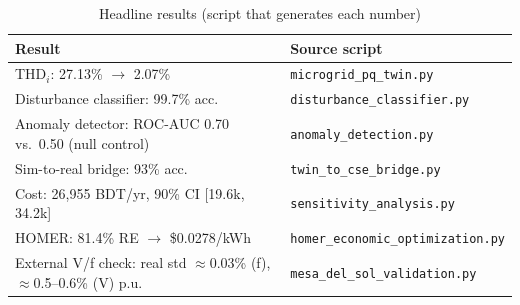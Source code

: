 \documentclass[conference]{IEEEtran}
\begin{document}
\begin{table}[t]
\centering
\caption{Headline results (script that generates each number)}
\label{tab:summary}
\begin{tabular}{p{4.6cm}p{3cm}}
\toprule
Result & Source script \\
\midrule
THD$_i$: 27.13\% $\to$ 2.07\% & \texttt{microgrid\_pq\_twin.py} \\
Disturbance classifier: 99.7\% acc. & \texttt{disturbance\_classifier.py} \\
Anomaly detector: ROC-AUC 0.70 vs.\ 0.50 (null control) & \texttt{anomaly\_detection.py} \\
Sim-to-real bridge: 93\% acc. & \texttt{twin\_to\_cse\_bridge.py} \\
Cost: 26,955 BDT/yr, 90\% CI [19.6k, 34.2k] & \texttt{sensitivity\_analysis.py} \\
HOMER: 81.4\% RE $\to$ \$0.0278/kWh & \texttt{homer\_economic\_optimization.py} \\
External V/f check: real std $\approx$0.03\% (f), $\approx$0.5--0.6\% (V) p.u.\ & \texttt{mesa\_del\_sol\_validation.py} \\
\bottomrule
\end{tabular}
\end{table}
\end{document}
